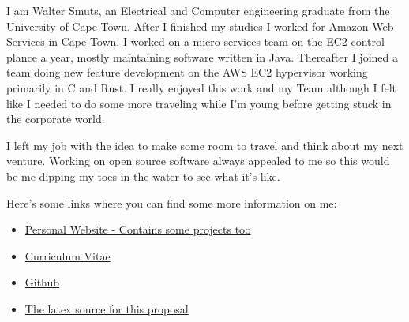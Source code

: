 I am Walter Smuts, an Electrical and Computer engineering graduate from the
University of Cape Town. After I finished my studies I worked for Amazon Web
Services in Cape Town. I worked on a micro-services team on the EC2 control plance
a year, mostly maintaining software written in Java. Thereafter I joined a team
doing new feature development on the AWS EC2 hypervisor working primarily in C and
Rust. I really enjoyed this work and my Team although I felt like I needed to do
some more traveling while I'm young before getting stuck in the corporate world.

I left my job with the idea to make some room to travel and think about my next
venture. Working on open source software always appealed to me so this would be me
dipping my toes in the water to see what it's like.

Here's some links where you can find some more information on me:
\begin{itemize}
\item \href{https://www.waltersmuts.com}{Personal Website - Contains some projects too}
\item \href{https://www.waltersmuts.com/Walter\%20Smuts\%20-\%20Curriculum\%20Vitae.pdf}{Curriculum Vitae}
\item \href{https://github.com/WalterSmuts}{Github}
\item \href{https://github.com/WalterSmuts/2022-summer-of-code-proposals}{The latex source for this proposal}
\end{itemize}
